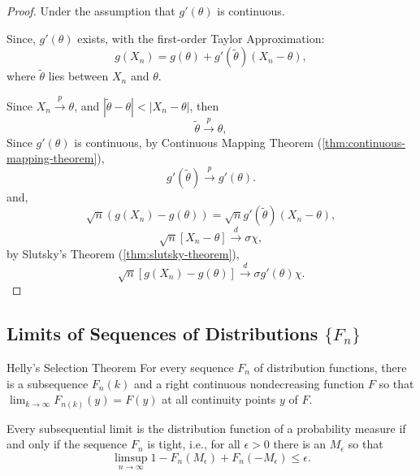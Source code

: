 \begin{proof}
    Under the assumption that $g'(\theta)$ is continuous.

    Since, $g'(\theta)$ exists, with the first-order Taylor Approximation:
    \begin{equation*}
        g(X_n)=g(\theta)+g'(\tilde{\theta})(X_n-\theta),
    \end{equation*}
    where $\tilde{\theta}$ lies between $X_n$ and $\theta$.

    Since $X_n\stackrel{p}{\rightarrow}\theta$, and $|\tilde{\theta}-\theta|<|X_n-\theta|$, then
    \begin{equation*}
        \tilde{\theta}\stackrel{p}{\rightarrow}\theta,
    \end{equation*}
    Since $g'(\theta)$   is continuous, by Continuous Mapping Theorem (\ref{thm:continuous-mapping-theorem}),
    \begin{equation*}
        g'(\tilde{\theta})\stackrel{p}{\rightarrow}g'(\theta).
    \end{equation*}
    and,
    \begin{equation*}
        \sqrt{n}\left(g(X_n)-g(\theta)\right)=\sqrt{n}g'(\tilde{\theta})(X_n-\theta),
    \end{equation*}
    \begin{equation*}
        \sqrt{n}\left[X_{n}-\theta\right] \stackrel{d}{\rightarrow}\sigma\chi,
    \end{equation*}
    by Slutsky's Theorem (\ref{thm:slutsky-theorem}),
    \begin{equation*}
        \sqrt{n}\left[g\left(X_{n}\right)-g(\theta)\right] \stackrel{d}{\rightarrow} \sigma g'(\theta)\chi.
    \end{equation*}
\end{proof}

\subsection{Limits of Sequences of Distributions $\{F_n\}$}

\begin{theorem}{Helly's Selection Theorem}{}
    For every sequence $F_{n}$ of distribution functions, there is a subsequence $F_{n}(k)$ and a right continuous nondecreasing function $F$ so that $\lim_{k\rightarrow\infty}F_{n(k)}(y)=F(y)$ at all continuity points $y$ of $F$.
\end{theorem}

\begin{theorem}{}{}
    Every subsequential limit is the distribution function of a probability measure if and only if the sequence $F_{n}$ is tight, i.e., for all $\epsilon>0$ there is an $M_{\epsilon}$ so that
    \begin{equation}
        \limsup_{n\rightarrow\infty}1-F_{n}\left(M_{\epsilon}\right)+F_{n}\left(-M_{\epsilon}\right)\leq\epsilon.
    \end{equation}
\end{theorem}

